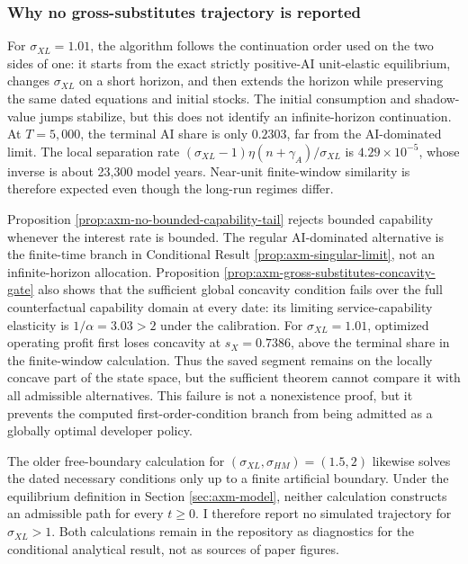 \subsubsection{Why no gross-substitutes trajectory is reported}

For \(\sigma_{XL}=1.01\), the algorithm follows the continuation order used on
the two sides of one: it starts from the exact strictly positive-AI
unit-elastic equilibrium, changes \(\sigma_{XL}\) on a short horizon, and then
extends the horizon while preserving the same dated equations and initial
stocks. The initial consumption and shadow-value jumps stabilize, but this does
not identify an infinite-horizon continuation. At \(T=5{,}000\), the terminal AI share
is only \(0.2303\), far from the AI-dominated limit. The local separation rate
\((\sigma_{XL}-1)\eta(n+\gamma_A)/\sigma_{XL}\) is
\(4.29\times10^{-5}\), whose inverse is about 23,300 model years. Near-unit
finite-window similarity is therefore expected even though the long-run
regimes differ.

Proposition \ref{prop:axm-no-bounded-capability-tail} rejects bounded
capability whenever the interest rate is bounded. The regular
AI-dominated alternative is the finite-time branch in Conditional Result
\ref{prop:axm-singular-limit}, not an infinite-horizon allocation. Proposition
\ref{prop:axm-gross-substitutes-concavity-gate} also shows that the sufficient
global concavity condition fails over the full counterfactual capability
domain at every date: its limiting service-capability elasticity is
\(1/\alpha=3.03>2\) under the calibration. For \(\sigma_{XL}=1.01\), optimized
operating profit first loses concavity at \(s_X=0.7386\), above the terminal
share in the finite-window calculation. Thus the saved segment remains on the
locally concave part of the state space, but the sufficient theorem cannot
compare it with all admissible alternatives. This failure is not a
nonexistence proof, but it prevents the computed first-order-condition branch
from being admitted as a globally optimal developer policy.

The older free-boundary calculation for
\((\sigma_{XL},\sigma_{HM})=(1.5,2)\) likewise solves the dated necessary
conditions only up to a finite artificial boundary. Under the equilibrium
definition in Section \ref{sec:axm-model}, neither calculation constructs an
admissible path for every \(t\geq0\). I therefore report no simulated
trajectory for \(\sigma_{XL}>1\). Both calculations remain in the repository
as diagnostics for the conditional analytical result, not as sources of paper
figures.

